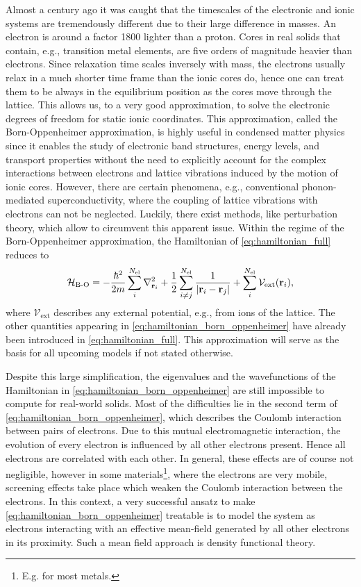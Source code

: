 \documentclass[\main/main.tex]{subfiles}
\begin{document}
Almost a century ago it was caught that the timescales of the electronic and ionic systems are tremendously different due to their large difference in masses. An electron is around a factor 1800 lighter than a proton. Cores in real solids that contain, e.g., transition metal elements, are five orders of magnitude heavier than electrons. Since relaxation time scales inversely with mass, the electrons usually relax in a much shorter time frame than the ionic cores do, hence one can treat them to be always in the equilibrium position as the cores move through the lattice. This allows us, to a very good approximation, to solve the electronic degrees of freedom for static ionic coordinates. This approximation, called the Born-Oppenheimer approximation, is highly useful in condensed matter physics since it enables the study of electronic band structures, energy levels, and transport properties without the need to explicitly account for the complex interactions between electrons and lattice vibrations induced by the motion of ionic cores. However, there are certain phenomena, e.g., conventional phonon-mediated superconductivity, where the coupling of lattice vibrations with electrons can not be neglected. Luckily, there exist methods, like perturbation theory, which allow to circumvent this apparent issue. Within the regime of the Born-Oppenheimer approximation, the Hamiltonian of \eqref{eq:hamiltonian_full} reduces to
\begin{align}\label{eq:hamiltonian_born_oppenheimer}
	\mathcal{H}_{\text{B-O}}=-\frac{\hbar^2}{2m}\sum_i^{N_{\text{el}}} \nabla^2_{\textbf{r}_i}+\frac 12\sum_{i\neq j}^{N_{\text{el}}} \frac{1}{|\textbf{r}_i-\textbf{r}_j|}+\sum_i^{N_{\text{el}}}\mathcal{V}_{\text{ext}}(\textbf{r}_i),
\end{align}
where $\mathcal{V}_{\text{ext}}$ describes any external potential, e.g., from ions of the lattice. The other quantities appearing in \eqref{eq:hamiltonian_born_oppenheimer} have already been introduced in \eqref{eq:hamiltonian_full}. This approximation will serve as the basis for all upcoming models if not stated otherwise.

Despite this large simplification, the eigenvalues and the wavefunctions of the Hamiltonian in \eqref{eq:hamiltonian_born_oppenheimer} are still impossible to compute for real-world solids. Most of the difficulties lie in the second term of \eqref{eq:hamiltonian_born_oppenheimer}, which describes the Coulomb interaction between pairs of electrons. Due to this mutual electromagnetic interaction, the evolution of every electron is influenced by all other electrons present. Hence all electrons are correlated with each other. In general, these effects are of course not negligible, however in some materials\footnote{E.g. for most metals.}, where the electrons are very mobile, screening effects take place which weaken the Coulomb interaction between the electrons. In this context, a very successful ansatz to make \eqref{eq:hamiltonian_born_oppenheimer} treatable is to model the system as electrons interacting with an effective mean-field generated by all other electrons in its proximity. Such a mean field approach is density functional theory. 
\end{document}
